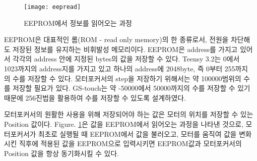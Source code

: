 \begin{figure}[ht]
	\begin{center}
		\texttt{[image: eepread]}
	\end{center}
	\caption{EEPROM에서 정보를 읽어오는 과정}
	\label{eepread}
\end{figure}

EEPROM은 대표적인 롬(ROM - read only memory)의 한 종류로서, 전원을 차단해도 저장된 정보를 유지하는 비휘발성 메모리이다. EEPROM은 address를 가지고 있어서 각각의 address 안에 지정된 bytes의 값을 저장할 수 있다. Teensy 3.2는 0에서 1023까지의 address지를 가지고 있고 하나의 address에 2048byte, 즉 0부터 255까지의 수를 저장할 수 있다. 모터포커서의 step을 저장하기 위해서는 약 100000범위의 수를 저장할 필요가 있다. GS-touch는 약 -50000에서 50000까지의 수를 저장할 수 있기 때문에 256진법을 활용하여 수를 저장할 수 있도록 설계하였다.


 모터포커서의 원활한 사용을 위해 저장되어야 하는 값은 모터의 위치를 저장할 수 있는 Position 값이다. \textrm{Figure}. \ref{eepread}은 값을 EEPROM에서 읽어오는 과정을 나타낸 것으로, 모터포커서가 최초로 실행될 때 EEPROM에서 값을 불러오고, 모터를 움직여 값을 변화시킨 직후에 적용된 값을 EEPROM으로 입력시키면 EEPROM값과 모터포커서의 Position 값을 항상 동기화시킬 수 있다.


